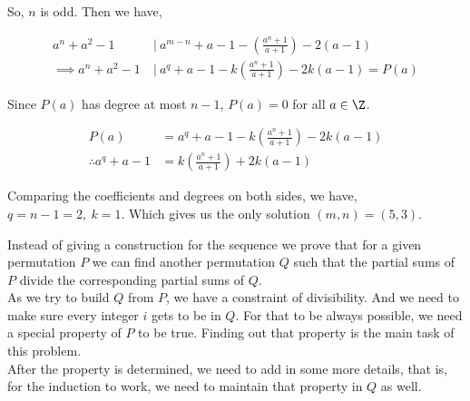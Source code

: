 \begin{solution}[Manipulation]
		So, $ n $ is odd. Then we have,
		
		\begin{align*}
		a^n+a^2-1\ &|\ a^{m-n} + a-1 - \left(\frac{a^n+1}{a+1}\right) - 2(a-1)\\[.5em]
		\implies a^n+a^2-1\ &|\ a^q + a -1 - k\left(\frac{a^n+1}{a+1}\right) -2k(a-1) = P(a)
		\end{align*}
		
		Since $ P(a) $ has degree at most $ n-1 $, $ P(a) =0 $ for all $ a\in \Z $.
		
		
		\begin{align*}
		P(a) &= a^q + a -1 - k\left(\frac{a^n+1}{a+1}\right) -2k(a-1)\\
		\therefore a^q + a - 1 &= k\left(\frac{a^n+1}{a+1}\right)+2k(a-1)
		\end{align*}
		
		Comparing the coefficients and degrees on both sides, we have, $ q=n-1=2,\ k=1 $. Which gives us the only solution $ (m, n) = (5, 3) $.
	\end{solution}
	
    
        \begin{solution}
            Instead of giving a construction for the sequence we prove that for a given permutation $P$ we can find another permutation $Q$ such that the partial sums of $P$ divide the corresponding partial sums of $Q$.\\
            
            As we try to build $Q$ from $P$, we have a constraint of divisibility. And we need to make sure every integer $i$ gets to be in $Q$. For that to be always possible, we need a special property of $P$ to be true. Finding out that property is the main task of this problem. \\
            
            After the property is determined, we need to add in some more details, that is, for the induction to work, we need to maintain that property in $Q$ as well.
        \end{solution}
